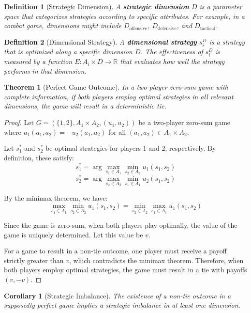 \documentclass{article}
\newtheorem{definition}{Definition}
\newtheorem{theorem}{Theorem}
\newtheorem{corollary}{Corollary}
\begin{document}
\begin{definition}[Strategic Dimension]
A \textbf{strategic dimension} $D$ is a parameter space that categorizes strategies according to specific attributes. For example, in a combat game, dimensions might include $D_{\text{offensive}}$, $D_{\text{defensive}}$, and $D_{\text{tactical}}$.
\end{definition}

\begin{definition}[Dimensional Strategy]
A \textbf{dimensional strategy} $s_i^D$ is a strategy that is optimized along a specific dimension $D$. The effectiveness of $s_i^D$ is measured by a function $E: A_i \times D \rightarrow \mathbb{R}$ that evaluates how well the strategy performs in that dimension.
\end{definition}

\begin{theorem}[Perfect Game Outcome]
In a two-player zero-sum game with complete information, if both players employ optimal strategies in all relevant dimensions, the game will result in a deterministic tie.
\end{theorem}

\begin{proof}
Let $G = (\{1, 2\}, A_1 \times A_2, (u_1, u_2))$ be a two-player zero-sum game where $u_1(a_1, a_2) = -u_2(a_1, a_2)$ for all $(a_1, a_2) \in A_1 \times A_2$.

Let $s_1^*$ and $s_2^*$ be optimal strategies for players 1 and 2, respectively. By definition, these satisfy:
\[s_1^* = \arg\max_{s_1 \in A_1} \min_{s_2 \in A_2} u_1(s_1, s_2)\]
\[s_2^* = \arg\max_{s_2 \in A_2} \min_{s_1 \in A_1} u_2(s_1, s_2)\]

By the minimax theorem, we have:
\[\max_{s_1 \in A_1} \min_{s_2 \in A_2} u_1(s_1, s_2) = \min_{s_2 \in A_2} \max_{s_1 \in A_1} u_1(s_1, s_2)\]

Since the game is zero-sum, when both players play optimally, the value of the game is uniquely determined. Let this value be $v$.

For a game to result in a non-tie outcome, one player must receive a payoff strictly greater than $v$, which contradicts the minimax theorem. Therefore, when both players employ optimal strategies, the game must result in a tie with payoffs $(v, -v)$.
\end{proof}

\begin{corollary}[Strategic Imbalance]
The existence of a non-tie outcome in a supposedly perfect game implies a strategic imbalance in at least one dimension.
\end{corollary}
\end{document}
